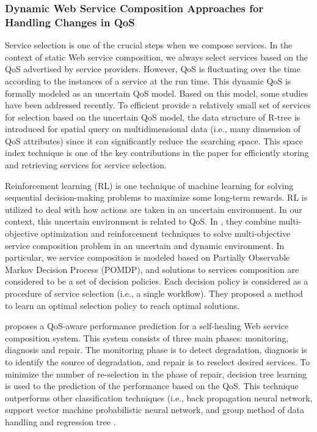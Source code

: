\subsubsection{Dynamic Web Service Composition Approaches for Handling Changes in QoS}\label{dynamicQoS}

Service selection is one of the crucial steps when we compose services. In the context of static Web service composition, we always select services based on the QoS advertised by service providers. However, QoS is fluctuating over the time according to the instances of a service at the run time. This dynamic QoS is formally modeled as an uncertain QoS model. Based on this model, some studies \cite{wen2014probabilistic} have been addressed recently. To efficient provide a relatively small set of services for selection based on the uncertain QoS model, the data structure of R-tree is introduced for spatial query on multidimensional data (i.e., many dimension of QoS attributes) since it can significantly reduce the searching space. This space index technique is one of the key contributions in the paper for efficiently storing and retrieving services for service selection. 

Reinforcement learning (RL) is one technique of machine learning for solving sequential decision-making problems to maximize some long-term rewards.  RL is utilized to deal with how actions are taken in an uncertain environment. In our context, this uncertain environment is related to QoS. In \cite{mostafa2015multi}, they combine multi-objective optimization and reinforcement techniques to solve multi-objective service composition problem in an uncertain and dynamic environment. In particular, we service composition is modeled based on Partially Observable Markov Decision Process (POMDP), and solutions to services composition are considered to be a set of decision policies. Each decision policy is considered as a procedure of service selection (i.e., a single workflow). They proposed a method to learn an optimal selection policy to reach optimal solutions.

\cite{nasridinov2012qos} proposes a QoS-aware performance prediction for a self-healing Web service composition system. This system consists of three main phases: monitoring, diagnosis and repair. The monitoring phase is to detect degradation, diagnosis is to identify the source of degradation, and repair is to reselect desired services. To minimize the number of re-selection in the phase of repair, decision tree learning is used to the prediction of the performance based on the QoS. This technique outperforms other classification techniques (i.e., back propagation neural network, support vector machine probabilistic neural network, and group method of data handling and regression tree \cite{mohanty2010web}.

